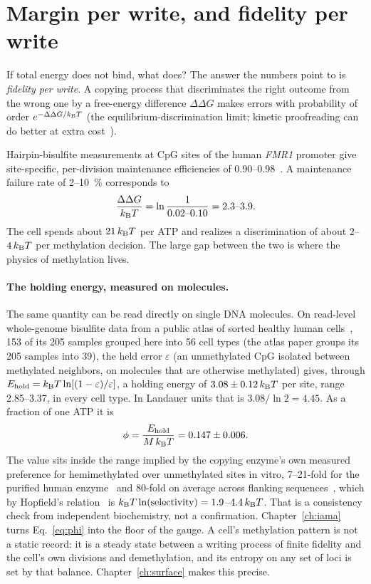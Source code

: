 \section{Margin per write, and fidelity per write}

If total energy does not bind, what does? The answer the numbers point to is \emph{fidelity per
write}. A copying process that discriminates the right outcome from the wrong one by a free-energy
difference $\Delta\Delta G$ makes errors with probability of order $e^{-\Delta\Delta G/k_{\mathrm B} T}$
(the equilibrium-discrimination limit; kinetic proofreading can do better at extra
cost~\cite{Hopfield1974}).

Hairpin-bisulfite measurements at CpG sites of the human \emph{FMR1} promoter give site-specific, per-division
maintenance efficiencies of 0.90--0.98~\cite{Genereux2005}. \observed{} A maintenance failure rate of 2--10~\%
corresponds to
\[
  \frac{\Delta\Delta G}{k_{\mathrm B} T}=\ln\frac{1}{0.02\text{--}0.10}=2.3\text{--}3.9 .
\]
\calc{} The cell spends about $21\,k_{\mathrm B} T$ per ATP and realizes a discrimination of about $2$--$4\,k_{\mathrm B} T$
per methylation decision. The large gap between the two is where the physics of methylation
lives.

\paragraph{The holding energy, measured on molecules.}\label{sec:p4holding} The same quantity can be read directly on single DNA molecules.
On read-level whole-genome bisulfite data from a public atlas of sorted healthy human cells~\cite{Loyfer2023}, 153 of its 205 samples
grouped here into 56 cell types (the atlas paper groups its 205 samples into 39), the held error $\varepsilon$
(an unmethylated CpG isolated between methylated neighbors, on molecules that are otherwise methylated) gives, through
$E_{\rm hold}=k_{\mathrm B} T\ln[(1-\varepsilon)/\varepsilon]$, a holding energy of $3.08\pm0.12\,k_{\mathrm B} T$ per site, range 2.85--3.37, in
every cell type. \measured{} In Landauer units that is $3.08/\ln2=4.45$. \calc{} As a fraction of one ATP it is
\begin{equation}
  \phi=\frac{E_{\rm hold}}{M\,k_{\mathrm B} T}=0.147\pm0.006 .
  \label{eq:phi}
\end{equation}
The value sits inside the range implied by the copying enzyme's own measured preference for hemimethylated over unmethylated
sites in vitro, 7--21-fold for the purified human enzyme~\cite{Pradhan1999} and 80-fold on average across flanking
sequences~\cite{Adam2023}, which by Hopfield's relation~\cite{Hopfield1974} is $k_{\mathrm B} T\ln(\text{selectivity})=1.9$--$4.4\,k_{\mathrm B} T$. \calc
That is a consistency check from independent biochemistry, not a confirmation. Chapter~\ref{ch:iama} turns
Eq.~\eqref{eq:phi} into the floor of the gauge. A cell's methylation pattern is not a static record: it is a steady state between a writing
process of finite fidelity and the cell's own divisions and demethylation, and its entropy on any
set of loci is set by that balance. Chapter~\ref{ch:surface} makes this precise.

